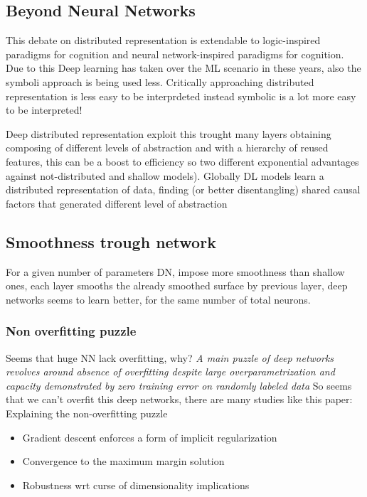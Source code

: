\documentclass[12pt]{book}
\begin{document}
\subsection{Beyond Neural Networks}
This debate on distributed representation is extendable to logic-inspired paradigms for cognition and neural network-inspired paradigms for cognition.\newline
Due to this Deep learning has taken over the ML scenario in these years, also the symboli approach is being used less.\newline
Critically approaching distributed representation is less easy to be interprdeted instead symbolic is a lot more easy to be interpreted!

Deep distributed representation exploit this trought many layers obtaining composing of different levels of abstraction and with a hierarchy of reused features, this can be a boost to efficiency so two different exponential advantages against not-distributed and shallow models).\newline
Globally DL models learn a distributed representation of data, finding (or better disentangling) shared causal factors that generated different level of abstraction

\subsection{Smoothness trough network}
For a given number of parameters DN, impose more smoothness than shallow ones, each layer smooths the already smoothed surface by previous layer, deep networks seems to learn better, for the same number of total neurons.\newline
\subsubsection{Non overfitting puzzle}
Seems that huge NN lack overfitting, why?\newline\newline
\textit{A main puzzle of deep networks revolves around absence of overfitting despite large overparametrization and capacity demonstrated by zero training error on randomly labeled data}
\newline\newline
So seems that we can't overfit this deep networks, there are many studies like this paper: Explaining the non-overfitting puzzle
\begin{itemize}
	\item Gradient descent enforces a form of implicit regularization
	\item Convergence to the maximum margin solution
	\item Robustness wrt curse of dimensionality implications
\end{itemize}
\end{document}
